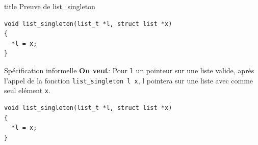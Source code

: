 \documentclass[hyperref={pdfpagelabels=false}]{beamer}
\begin{document}

\begin{frame}[fragile]
  \vfill
  \centering
  \begin{beamercolorbox}[sep=8pt,center,shadow=true,rounded=true]{title}
    Preuve de list\_singleton\par%
  \end{beamercolorbox}
  \vfill
  \begin{center}
    \begin{minipage}{0.8\textwidth}
      \begin{verbatim}
void list_singleton(list_t *l, struct list *x)
{
  *l = x;
}
      \end{verbatim}
    \end{minipage}
  \end{center}
\end{frame}

\begin{frame}[fragile]{Spécification informelle}
  \textbf{On veut}: Pour \texttt{l} un pointeur sur une liste valide, après l'appel de la fonction \texttt{list\_singleton l x}, l pointera sur une liste avec comme seul elément \texttt{x}. \\
  \vfill
  \begin{center}
    \begin{minipage}{0.8\textwidth}
      \begin{verbatim}
void list_singleton(list_t *l, struct list *x)
{
  *l = x;
}
      \end{verbatim}
    \end{minipage}
  \end{center}

\end{frame}
\end{document}
